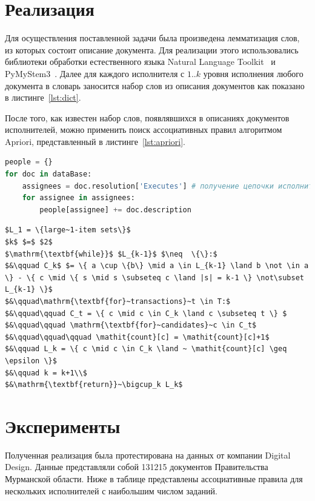 \documentclass[14pt]{matmex-diploma-custom}
\begin{document}
\section{Реализация}
Для осуществления поставленной задачи была произведена лемматизация слов, из которых состоит описание документа. Для реализации этого использовались библиотеки обработки естественного языка Natural Language Toolkit~\cite{nltk} и PyMyStem3~\cite{yandex}. Далее для каждого исполнителя с $1..k$ уровня исполнения любого документа в словарь заносится набор слов из описания документов как показано в листинге~\ref{lst:dict}.

После того, как известен набор слов, появлявшихся в описаниях документов исполнителей, можно применить поиск ассоциативных правил алгоритмом Apriori, представленный в листинге~\ref{lst:apriori}.

\begin{lstlisting}[language=Python,caption={Псевдокод создания словаря исполнителей},captionpos=t,label={lst:dict}]
people = {}
for doc in dataBase:
    assignees = doc.resolution['Executes'] # получение цепочки исполнителей документа
    for assignee in assignees:
        people[assignee] += doc.description
\end{lstlisting}

\begin{lstlisting}[caption={Псевдокод алгоритма Apriori},captionpos=t,label={lst:apriori}, mathescape=true]
$L_1 = \{large~1-item sets\}$
$k$ $=$ $2$
$\mathrm{\textbf{while}}$ $L_{k-1}$ $\neq  \{\}:$
$&\qquad C_k$ $= \{ a \cup \{b\} \mid a \in L_{k-1} \land b \not \in a \} - \{ c \mid \{ s \mid s \subseteq c \land |s| = k-1 \} \not\subset L_{k-1} \}$
$&\qquad\mathrm{\textbf{for}~transactions}~t \in T:$
$&\qquad\qquad C_t = \{ c \mid c \in C_k \land c \subseteq t \} $
$&\qquad\qquad \mathrm{\textbf{for}~candidates}~c \in C_t$
$&\qquad\qquad\qquad \mathit{count}[c] = \mathit{count}[c]+1$
$&\qquad L_k = \{ c \mid c \in C_k \land ~ \mathit{count}[c] \geq \epsilon \}$
$&\qquad k = k+1\\$
$&\mathrm{\textbf{return}}~\bigcup_k L_k$
\end{lstlisting}



\section{Эксперименты}
Полученная реализация была протестирована на данных от компании Digital Design. Данные представляли собой 131215 документов Правительства Мурманской области. Ниже в таблице представлены ассоциативные правила для нескольких исполнителей с наибольшим числом заданий. 
\end{document}
